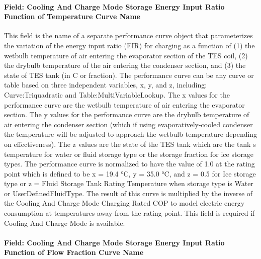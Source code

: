 \paragraph{Field: Cooling And Charge Mode Storage Energy Input Ratio Function of Temperature Curve Name}\label{field-cooling-and-charge-mode-storage-energy-input-ratio-function-of-temperature-curve-name}

This field is the name of a separate performance curve object that parameterizes the variation of the energy input ratio (EIR) for charging as a function of (1) the wetbulb temperature of air entering the evaporator section of the TES coil, (2) the drybulb temperature of the air entering the condenser section, and (3) the state of TES tank (in C or fraction). The performance curve can be any curve or table based on three independent variables, x, y, and z, including: Curve:Triquadratic and Table:MultiVariableLookup. The x values for the performance curve are the wetbulb temperature of air entering the evaporator section. The y values for the performance curve are the drybulb temperature of air entering the condenser section (which if using evaporatively-cooled condenser the temperature will be adjusted to approach the wetbulb temperature depending on effectiveness). The z values are the state of the TES tank which are the tank s temperature for water or fluid storage type or the storage fraction for ice storage types. The performance curve is normalized to have the value of 1.0 at the rating point which is defined to be x = 19.4 °C, y = 35.0 °C, and z = 0.5 for Ice storage type or z = Fluid Storage Tank Rating Temperature when storage type is Water or UserDefinedFluidType. The result of this curve is multiplied by the inverse of the Cooling And Charge Mode Charging Rated COP to model electric energy consumption at temperatures away from the rating point. This field is required if Cooling And Charge Mode is available.

\paragraph{Field: Cooling And Charge Mode Storage Energy Input Ratio Function of Flow Fraction Curve Name}\label{field-cooling-and-charge-mode-storage-energy-input-ratio-function-of-flow-fraction-curve-name}

